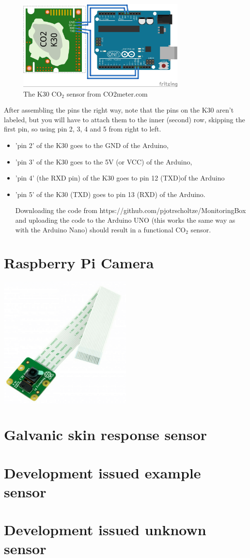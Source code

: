 \documentclass{report}
\begin{document}
\begin{figure}[H]
	\centering
\includegraphics[width=0.75\textwidth]{images/K30-gas-sensor-schematic.jpg} 
	\caption{The K30 CO$_2$ sensor from  CO2meter.com}
\end{figure}

After assembling the pins the right way, note that the pins on the K30 aren't labeled, but you will have to attach them to the inner (second) row, skipping the first pin, so using pin 2, 3, 4 and 5 from right to left. 
\begin{itemize}
\item 'pin 2' of the K30 goes to the GND of the Arduino, 
\item 'pin 3' of the K30 goes to the 5V (or VCC) of the Arduino,
\item 'pin 4' (the RXD pin) of the K30 goes to pin 12 (TXD)of the Arduino 
\item 'pin 5' of the K30 (TXD) goes to pin 13 (RXD) of the Arduino. 

Downloading the code from https://github.com/pjotrscholtze/MonitoringBox and uploading the code to the Arduino UNO (this works the same way as with the Arduino Nano) should result in a functional CO$_2$ sensor. 
\end{itemize}
\chapter{Raspberry Pi Camera}
\includegraphics[width=0.50\textwidth]{images/Raspberry-Pi-Camera-Board-v2-1.png}

\chapter{Galvanic skin response sensor}

\chapter{Development issued example sensor}

\chapter{Development issued unknown sensor}
\end{document}
